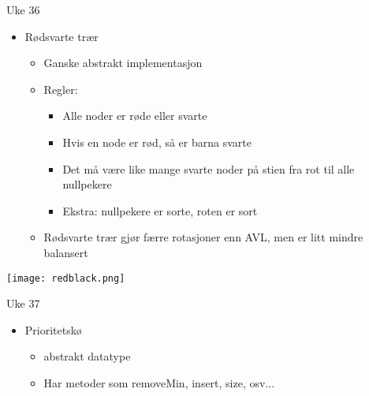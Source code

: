 \documentclass[norsk]{beamer}
\begin{document}
	\begin{frame}{Uke 36}
		\begin{itemize}
			\item Rødsvarte trær

			\begin{itemize}
				\item Ganske abstrakt implementasjon
				\item Regler:
					\begin{itemize}
						\item Alle noder er røde eller svarte
						\item Hvis en node er rød, så er barna svarte
						\item Det må være like mange svarte noder på stien fra rot til alle
							nullpekere
						\item Ekstra: nullpekere er sorte, roten er sort
					\end{itemize}
				\item Rødsvarte trær gjør færre rotasjoner enn AVL, men er litt mindre
					balansert
			\end{itemize}
		\end{itemize}

		\begin{center}
			\texttt{[image: redblack.png]}
		\end{center}
	\end{frame}

	\begin{frame}{Uke 37}
	\begin{itemize}
		\item Prioritetskø
			\begin{itemize}
				\item abstrakt datatype
				\item Har metoder som removeMin, insert, size, osv...
			\end{itemize}
	\end{itemize}
	\end{frame}
\end{document}
